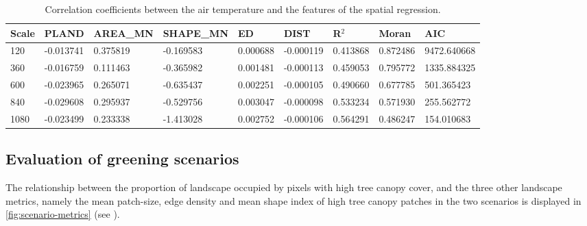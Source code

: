 \documentclass[10pt,letterpaper]{article}
\begin{document}
\begin{table}[H]
  \begin{center}
    \begin{tabular}{ p{} p{} p{} p{} p{} p{} p{} p{} p{} }
      \toprule
      Scale & PLAND & AREA\_MN & SHAPE\_MN & ED & DIST & R$^2$ & Moran & AIC\\
      \midrule
120 & -0.013741 & 0.375819 & -0.169583 & 0.000688 & -0.000119 & 0.413868 & 0.872486 & 9472.640668 \\
360 & -0.016759 & 0.111463 & -0.365982 & 0.001481 & -0.000113 & 0.459053 & 0.795772 & 1335.884325 \\
600 & -0.023965 & 0.265071 & -0.635437 & 0.002251 & -0.000105 & 0.490660 & 0.677785 & 501.365423 \\
840 & -0.029608 & 0.295937 & -0.529756 & 0.003047 & -0.000098 & 0.533234 & 0.571930 & 255.562772 \\
1080 & -0.023499 & 0.233338 & -1.413028 & 0.002752 & -0.000106 & 0.564291 & 0.486247 & 154.010683 \\
      \bottomrule
    \end{tabular}
    \caption{\label{tab:spatial-regression} Correlation coefficients between the air temperature and the features of the spatial regression. }

  \end{center}
\end{table}



\subsection*{Evaluation of greening scenarios}

The relationship between the proportion of landscape occupied by pixels with high tree canopy cover, and the three other landscape metrics, namely the mean patch-size, edge density and mean shape index of high tree canopy patches in the two scenarios is displayed in \autoref{fig:scenario-metrics} (see ).
\end{document}
